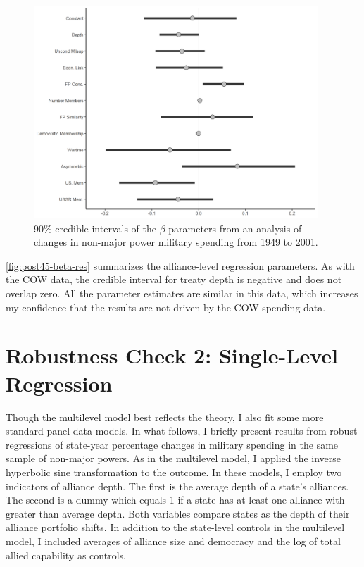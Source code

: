 \documentclass[12pt]{article}
\begin{document}
\begin{figure}[htbp]
	\centering
		\includegraphics[width=0.95\textwidth]{post45-beta-res.png}
	\caption{90\% credible intervals of the $\beta$ parameters from an analysis of changes in non-major power military spending from 1949 to 2001.}
	\label{fig:post45-beta-res}
\end{figure}


\autoref{fig:post45-beta-res} summarizes the alliance-level regression parameters. 
As with the COW data, the credible interval for treaty depth is negative and does not overlap zero. 
All the parameter estimates are similar in this data, which increases my confidence that the results are not driven by the COW spending data. 

 


\section{Robustness Check 2: Single-Level Regression}

Though the multilevel model best reflects the theory, I also fit some more standard panel data models. 
In what follows, I briefly present results from robust regressions of state-year percentage changes in military spending in the same sample of non-major powers. 
As in the multilevel model, I applied the inverse hyperbolic sine transformation to the outcome. 
In these models, I employ two indicators of alliance depth. 
The first is the average depth of a state's alliances. 
The second is a dummy which equals 1 if a state has at least one alliance with greater than average depth. 
Both variables compare states as the depth of their alliance portfolio shifts. 
In addition to the state-level controls in the multilevel model, I included averages of alliance size and democracy and the log of total allied capability as controls. 
\end{document}
